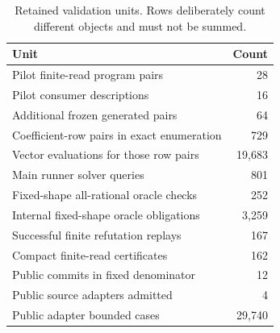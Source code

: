 \begin{table}[t]
\caption{Retained validation units. Rows deliberately count different objects and must not be summed.}\label{tab:validation}
\centering
\begin{tabular}{lr}
\toprule
Unit & Count\\\midrule
Pilot finite-read program pairs & 28\\
Pilot consumer descriptions & 16\\
Additional frozen generated pairs & 64\\
Coefficient-row pairs in exact enumeration & 729\\
Vector evaluations for those row pairs & 19,683\\
Main runner solver queries & 801\\
Fixed-shape all-rational oracle checks & 252\\
Internal fixed-shape oracle obligations & 3,259\\
Successful finite refutation replays & 167\\
Compact finite-read certificates & 162\\
Public commits in fixed denominator & 12\\
Public source adapters admitted & 4\\
Public adapter bounded cases & 29,740\\
\bottomrule
\end{tabular}
\end{table}
